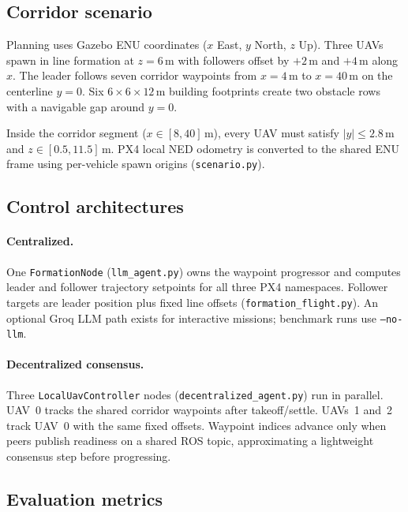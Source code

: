 \documentclass[a4paper,11pt]{article}
\begin{document}
\subsection{Corridor scenario}

Planning uses Gazebo ENU coordinates ($x$ East, $y$ North, $z$ Up). Three UAVs spawn in line formation at $z = 6\,\mathrm{m}$ with followers offset by $+2\,\mathrm{m}$ and $+4\,\mathrm{m}$ along $x$. The leader follows seven corridor waypoints from $x=4\,\mathrm{m}$ to $x=40\,\mathrm{m}$ on the centerline $y=0$. Six $6\times6\times12\,\mathrm{m}$ building footprints create two obstacle rows with a navigable gap around $y=0$.

Inside the corridor segment ($x \in [8,40]\,\mathrm{m}$), every UAV must satisfy $|y| \le 2.8\,\mathrm{m}$ and $z \in [0.5, 11.5]\,\mathrm{m}$. PX4 local NED odometry is converted to the shared ENU frame using per-vehicle spawn origins (\texttt{scenario.py}).

\subsection{Control architectures}

\paragraph{Centralized.}
One \texttt{FormationNode} (\texttt{llm\_agent.py}) owns the waypoint progressor and computes leader and follower trajectory setpoints for all three PX4 namespaces. Follower targets are leader position plus fixed line offsets (\texttt{formation\_flight.py}). An optional Groq LLM path exists for interactive missions; benchmark runs use \texttt{--no-llm}.

\paragraph{Decentralized consensus.}
Three \texttt{LocalUavController} nodes (\texttt{decentralized\_agent.py}) run in parallel. UAV~0 tracks the shared corridor waypoints after takeoff/settle. UAVs~1 and~2 track UAV~0 with the same fixed offsets. Waypoint indices advance only when peers publish readiness on a shared ROS topic, approximating a lightweight consensus step before progressing.

\subsection{Evaluation metrics}
\end{document}
